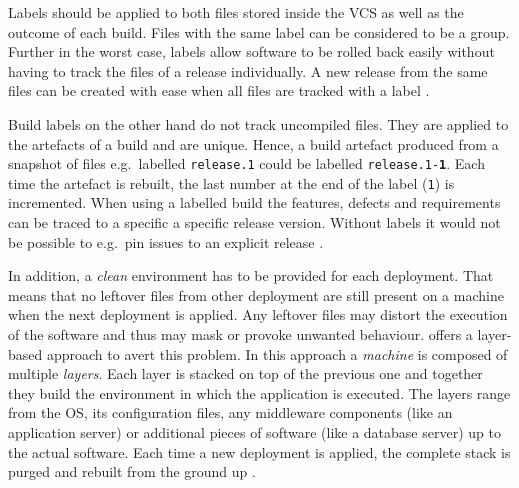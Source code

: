 Labels should be applied to both files stored inside the \ac{VCS} as well as
the outcome of each build. Files with the same label can be considered to be a
group. Further in the worst case, labels allow software to be rolled back
easily without having to track the files of a release individually. A new
release from the same files can be created with ease when all files are tracked
with a label \autocite[pp. 191-194]{MatyasContinuousIntegration2007}.

Build labels on the other hand do not track uncompiled files. They are applied
to the artefacts of a build and are unique. Hence, a build artefact produced
from a snapshot of files e.g.\ labelled \texttt{release.1}
could be labelled \texttt{release.1-\textbf{1}}. Each time
the artefact is rebuilt, the last number at the end of the label (\texttt{1})
is incremented. When using a labelled build the features, defects and
requirements can be traced to a specific a specific release version. Without
labels it would not be possible to e.g.\ pin issues to an explicit release
\autocite[pp. 195f.]{MatyasContinuousIntegration2007}.

In addition, a \textit{clean} environment has to be provided for each
deployment. That means that no leftover files from other deployment are still
present on a machine when the next deployment is applied. Any leftover files
may distort the execution of the software and thus may mask or provoke unwanted
behaviour. \autocite{ArtacDevOpsIntroducingInfrastructure2017} offers a
layer-based approach to avert this problem. In this approach a \textit{machine}
is composed of multiple \textit{layers}. Each layer is stacked on top of the
previous one and together they build the environment in which the application
is executed. The layers range from the \ac{OS}, its configuration files, any
middleware components (like an application server) or additional pieces of
software (like a database server) up to the actual software. Each time a new
deployment is applied, the complete stack is purged and rebuilt from the ground
up \autocite[p. 194]{MatyasContinuousIntegration2007}.

